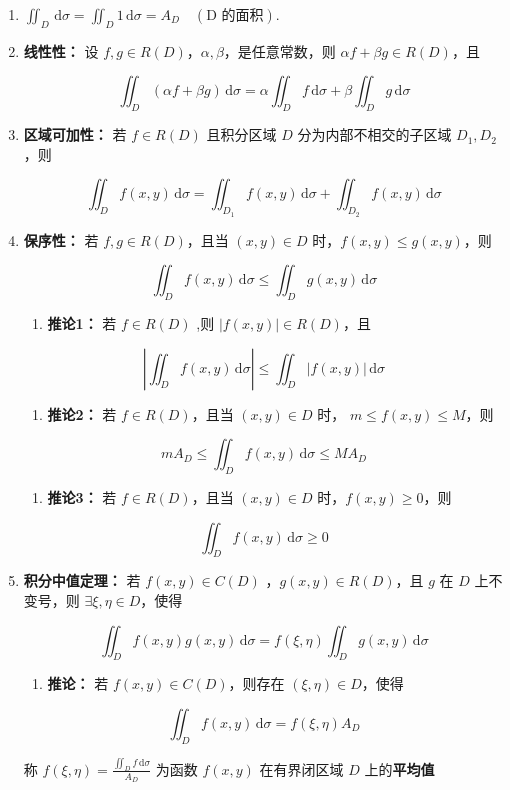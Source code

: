 \documentclass[lang = zh , final , oneside , openany , titlepage , zihao = -4 , linespread = 1.3 , baselineskip = false , cjk-font = windows , text-font = newtx , math-font = newtx , math-style = ISO , uppercase-greek = upright , integral-limits = false]{sjtureport}
\begin{document}
\begin{enumerate}
\def\labelenumi{\arabic{enumi}.}
\item
  \(\displaystyle\iint_D\,\mathrm{d}\sigma = \iint_D 1\,\mathrm{d}\sigma = A_D \quad\left(\text{D 的面积}\right)\).
\item
  \textbf{线性性：} 设
  \(f,g\in R(D)\)，\(\alpha , \beta\)，是任意常数，则
  \(\alpha f +\beta g \in R(D)\)，且

  \[\iint_D (\alpha f +\beta g)\,\mathrm{d}\sigma = \alpha \iint_D f\,\mathrm{d}\sigma + \beta \iint_D g\,\mathrm{d}\sigma\]
\item
  \textbf{区域可加性：} 若 \(f\in R(D)\) 且积分区域 \(D\)
  分为内部不相交的子区域 \(D_1 , D_2\)，则

  \[\iint_D f(x,y) \,\mathrm{d}\sigma = \iint_{D_1} f(x,y)\,\mathrm{d}\sigma + \iint_{D_2} f(x,y)\,\mathrm{d}\sigma\]
\item
  \textbf{保序性：} 若 \(f,g\in R(D)\)，且当 \((x,y)\in D\)
  时，\(f(x,y)\leq g(x,y)\)，则

  \[\iint_D f(x,y)\,\mathrm{d}\sigma \leq \iint_D g(x,y)\,\mathrm{d}\sigma\]

  \begin{enumerate}
  \item
    \textbf{推论1：} 若 \(f\in R(D)\) ,则
    \(\vert f(x,y) \vert \in R(D)\)，且
  \end{enumerate}

  \[\left\vert \iint_D f(x,y)\,\mathrm{d}\sigma \right\vert \leq \iint_D \vert f(x,y) \vert \,\mathrm{d}\sigma\]

  \begin{enumerate}
  \item
    \textbf{推论2：} 若 \(f\in R(D)\)，且当 \((x,y)\in D\) 时，
    \(m\leq f(x,y) \leq M\)，则
  \end{enumerate}

  \[mA_D \leq \iint_D f(x,y)\,\mathrm{d}\sigma \leq MA_D\]

  \begin{enumerate}
  \item
    \textbf{推论3：} 若 \(f\in R(D)\)，且当 \((x,y)\in D\)
    时，\(f(x,y) \geq 0\)，则
  \end{enumerate}

  \[\iint_D f(x,y)\,\mathrm{d}\sigma \geq 0\]
\item
  \textbf{积分中值定理：} 若 \(f(x,y)\in C(D)\) ，\(g(x,y)\in R(D)\)，且
  \(g\) 在 \(D\) 上不变号，则 \(\exists \xi , \eta \in D\)，使得

  \[\iint_D f(x,y)g(x,y)\,\mathrm{d}\sigma = f(\xi ,\eta )\iint_D g(x,y)\,\mathrm{d}\sigma\]

  \begin{enumerate}
  \item
    \textbf{推论：} 若 \(f(x,y)\in C(D)\)，则存在
    \((\xi , \eta )\in D\)，使得
  \end{enumerate}

  \[\iint_D f(x,y)\,\mathrm{d}\sigma = f(\xi ,\eta )A_D\]

  称 \(f(\xi,\eta) = \frac{\iint_D f\,\mathrm{d}\sigma}{A_D}\) 为函数
  \(f(x,y)\) 在有界闭区域 \(D\) 上的\textbf{平均值}
\end{enumerate}
\end{document}
